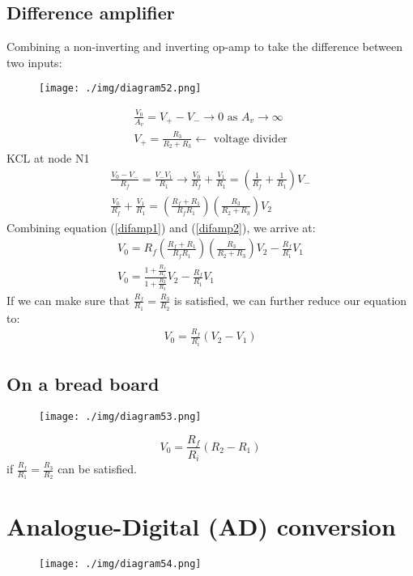 \subsection{Difference amplifier}
Combining a non-inverting and inverting op-amp to take the difference between two inputs:
\begin{figure}[H]
  \centering
  \texttt{[image: ./img/diagram52.png]}
\end{figure}
\begin{gather}
  \frac{V_0}{A_v} = V_+ - V_- \rightarrow 0 \textrm{ as } A_v \rightarrow \infty\\
  V_+ = \frac{R_3}{R_2 + R_3} \leftarrow \textrm{ voltage divider} \label{difamp1}
\end{gather}
KCL at node N1
\begin{gather}
  \frac{V_0 - V_-}{R_f} = \frac{V_- V_1}{R_1} \rightarrow \frac{V_0}{R_f} + \frac{V_1}{R_1} = \left(\frac{1}{R_f} + \frac{1}{R_1}\right)V_-\\
  \frac{V_0}{R_f} + \frac{V_1}{R_1} = \left(\frac{R_f + R_1}{R_f R_1}\right)\left(\frac{R_3}{R_2 + R_3}\right)V_2 \label{difamp2}
\end{gather}
Combining equation (\ref{difamp1}) and (\ref{difamp2}), we arrive at:
\begin{gather}
  V_0 = R_f \left(\frac{R_f + R_1}{R_f R_1}\right)\left(\frac{R_3}{R_2 + R_3}\right)V_2 - \frac{R_f}{R_1} V_1\\
  V_0 = \frac{1 + \frac{R_f}{R_1}}{1 + \frac{R_2}{R_3}}V_2 - \frac{R_f}{R_1}V_1
\end{gather}
If we can make sure that $\frac{R_f}{R_1} = \frac{R_3}{R_2}$ is satisfied, we can further reduce our equation to:
\begin{gather}
  V_0 = \frac{R_f}{R_i}(V_2 - V_1)
\end{gather}
\subsection{On a bread board}
\begin{figure}[H]
  \centering
  \texttt{[image: ./img/diagram53.png]}
\end{figure}
\begin{equation}
  V_0 = \frac{R_f}{R_i}(R_2 - R_1)
\end{equation}
if $\frac{R_f}{R_1} = \frac{R_3}{R_2}$ can be satisfied.
\section{Analogue-Digital (AD) conversion}
\begin{figure}[H]
  \centering
  \texttt{[image: ./img/diagram54.png]}
\end{figure}
